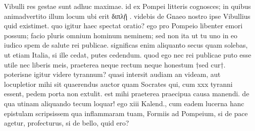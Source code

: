  Vibulli res gestae sunt adhuc maximae. id ex Pompei litteris cognosces; in quibus animadvertito illum locum ubi erit διπλῇ . videbis de Gnaeo nostro ipse Vibullius quid existimet. quo igitur haec spectat oratio? ego pro Pompeio libenter emori possum; facio pluris omnium hominum neminem; sed non ita ut tu uno in eo iudico spem de salute rei publicae. significas enim aliquanto secus quam solebas, ut etiam Italia, si ille cedat, putes cedendum. quod ego nec rei publicae puto esse utile nec liberis meis, praeterea neque rectum neque honestum †sed cur†. poterisne igitur videre tyrannum? quasi intersit audiam an videam, aut locupletior mihi sit quaerendus auctor quam Socrates qui, cum xxx tyranni essent, pedem porta non extulit. est mihi praeterea praecipua causa manendi. de qua utinam aliquando tecum loquar! ego xiii Kalend., cum eadem lucerna hanc epistulam scripsissem qua inflammaram tuam, Formiis ad Pompeium, si de pace agetur, profecturus, si de bello, quid ero?
